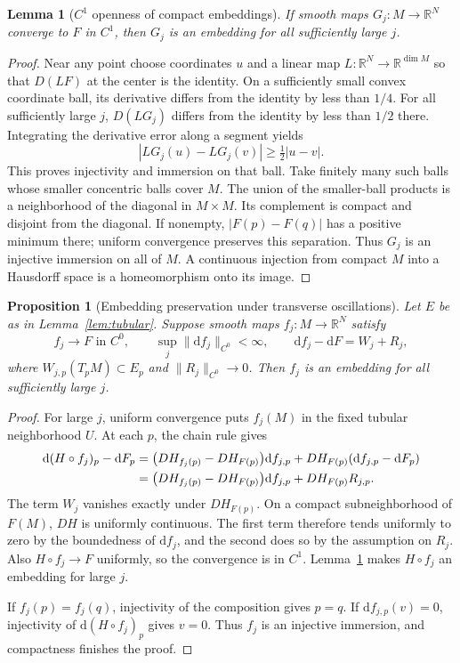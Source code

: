 \documentclass[11pt,a4paper]{article}
\newcommand{\R}{\mathbb R}
\newcommand{\dd}{\mathrm d}
\newtheorem{proposition}[theorem]{Proposition}
\newtheorem{lemma}[theorem]{Lemma}
\theoremstyle{definition}
\theoremstyle{remark}
\numberwithin{equation}{section}
\begin{document}
\begin{lemma}[$C^1$ openness of compact embeddings]
\label{lem:open}
If smooth maps $G_j:M\to\R^N$ converge to $F$ in $C^1$, then $G_j$
is an embedding for all sufficiently large $j$.
\end{lemma}
\begin{proof}
Near any point choose coordinates $u$ and a linear map
$L:\R^N\to\R^{\dim M}$ so that $D(LF)$ at the center is the identity.
On a sufficiently small convex coordinate ball, its derivative differs
from the identity by less than $1/4$. For all sufficiently large $j$,
$D(LG_j)$ differs from the identity by less than $1/2$ there. Integrating
the derivative error along a segment yields
\[
 |LG_j(u)-LG_j(v)|\ge\tfrac12|u-v|.
\]
This proves injectivity and immersion on that ball. Take finitely many
such balls whose smaller concentric balls cover $M$. The union of the
smaller-ball products is a neighborhood of the diagonal in $M\times M$.
Its complement is compact and disjoint from the diagonal. If nonempty,
$|F(p)-F(q)|$ has a positive minimum there; uniform convergence preserves
this separation. Thus $G_j$ is an injective immersion on all of $M$.
A continuous injection from compact $M$ into a Hausdorff space is a
homeomorphism onto its image.
\end{proof}

\begin{proposition}[Embedding preservation under transverse oscillations]
\label{prop:stability}
Let $E$ be as in Lemma~\ref{lem:tubular}. Suppose smooth maps
$f_j:M\to\R^N$ satisfy
\begin{equation}
 f_j\to F\text{ in }C^0,\qquad
 \sup_j\|\dd f_j\|_{C^0}<\infty,\qquad
 \dd f_j-\dd F=W_j+R_j,
 \label{eq:abstract-assumptions}
\end{equation}
where $W_{j,p}(T_pM)\subset E_p$ and $\|R_j\|_{C^0}\to0$.
Then $f_j$ is an embedding for all sufficiently large $j$.
\end{proposition}
\begin{proof}
For large $j$, uniform convergence puts $f_j(M)$ in the fixed tubular
neighborhood $U$. At each $p$, the chain rule gives
\begin{align}
 \dd(H\circ f_j)_p-\dd F_p
 &=\bigl(DH_{f_j(p)}-DH_{F(p)}\bigr)\dd f_{j,p}
   +DH_{F(p)}(\dd f_{j,p}-\dd F_p)\notag\\
 &=\bigl(DH_{f_j(p)}-DH_{F(p)}\bigr)\dd f_{j,p}
   +DH_{F(p)}R_{j,p}.
 \label{eq:cancellation}
\end{align}
The term $W_j$ vanishes exactly under $DH_{F(p)}$.
On a compact subneighborhood of $F(M)$, $DH$ is uniformly continuous.
The first term therefore tends uniformly to zero by the boundedness
of $\dd f_j$, and the second does so by the assumption on $R_j$.
Also $H\circ f_j\to F$ uniformly, so the convergence is in $C^1$.
Lemma~\ref{lem:open} makes $H\circ f_j$ an embedding for large $j$.

If $f_j(p)=f_j(q)$, injectivity of the composition gives $p=q$.
If $\dd f_{j,p}(v)=0$, injectivity of $\dd(H\circ f_j)_p$ gives $v=0$.
Thus $f_j$ is an injective immersion, and compactness finishes the proof.
\end{proof}
\end{document}
